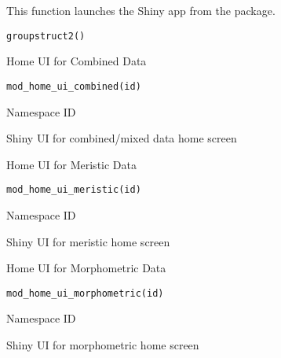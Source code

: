 \documentclass[a4paper]{book}
\begin{document}
%
\begin{Description}
This function launches the Shiny app from the package.
\end{Description}
%
\begin{Usage}
\begin{verbatim}
groupstruct2()
\end{verbatim}
\end{Usage}
%
\begin{Description}
Home UI for Combined Data
\end{Description}
%
\begin{Usage}
\begin{verbatim}
mod_home_ui_combined(id)
\end{verbatim}
\end{Usage}
%
\begin{Arguments}
\begin{ldescription}
\item[\code{id}] Namespace ID
\end{ldescription}
\end{Arguments}
%
\begin{Value}
Shiny UI for combined/mixed data home screen
\end{Value}
%
\begin{Description}
Home UI for Meristic Data
\end{Description}
%
\begin{Usage}
\begin{verbatim}
mod_home_ui_meristic(id)
\end{verbatim}
\end{Usage}
%
\begin{Arguments}
\begin{ldescription}
\item[\code{id}] Namespace ID
\end{ldescription}
\end{Arguments}
%
\begin{Value}
Shiny UI for meristic home screen
\end{Value}
%
\begin{Description}
Home UI for Morphometric Data
\end{Description}
%
\begin{Usage}
\begin{verbatim}
mod_home_ui_morphometric(id)
\end{verbatim}
\end{Usage}
%
\begin{Arguments}
\begin{ldescription}
\item[\code{id}] Namespace ID
\end{ldescription}
\end{Arguments}
%
\begin{Value}
Shiny UI for morphometric home screen
\end{Value}
\printindex{}
\end{document}

